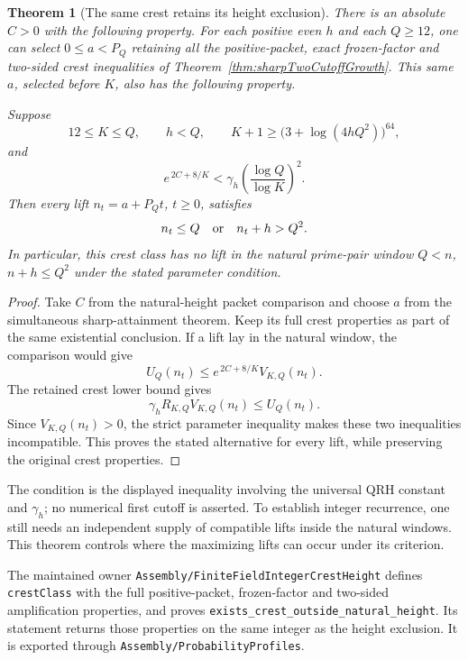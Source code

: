 \documentclass[11pt]{article}
\newtheorem{theorem}{Theorem}[section]
\begin{document}
\begin{theorem}[The same crest retains its height exclusion]
\label{thm:crest-height-exclusion}
There is an absolute \(C>0\) with the following property.
For each positive even \(h\) and each \(Q\geq12\), one can select
\(0\leq a<P_Q\) retaining all the positive-packet, exact frozen-factor
and two-sided crest inequalities of Theorem~\ref{thm:sharpTwoCutoffGrowth}.
This same \(a\), selected before \(K\), also has the following property.

Suppose
\[
 12\leq K\leq Q,\qquad h<Q,\qquad
 K+1\geq\bigl(3+\log(4hQ^2)\bigr)^{64},
\]
and
\[
                 e^{\,2C+8/K}<\gamma_h
                        \left(\frac{\log Q}{\log K}\right)^2.
\]
Then every lift \(n_t=a+P_Qt\), \(t\geq0\), satisfies
\[
                         n_t\leq Q\quad\hbox{or}\quad n_t+h>Q^2.
\]
In particular, this crest class has no lift in the natural prime-pair
window \(Q<n\), \(n+h\leq Q^2\) under the stated parameter condition.
\end{theorem}
\begin{proof}
Take \(C\) from the natural-height packet comparison and choose \(a\)
from the simultaneous sharp-attainment theorem. Keep its full crest
properties as part of the same existential conclusion.
If a lift lay in the natural window, the comparison would give
\[
                    U_Q(n_t)\leq e^{\,2C+8/K}V_{K,Q}(n_t).
\]
The retained crest lower bound gives
\[
               \gamma_hR_{K,Q}V_{K,Q}(n_t)\leq U_Q(n_t).
\]
Since \(V_{K,Q}(n_t)>0\), the strict parameter inequality makes these
two inequalities incompatible. This proves the stated alternative
for every lift, while preserving the original crest properties.
\end{proof}

The condition is the displayed inequality involving the universal QRH
constant and \(\gamma_h\); no numerical first cutoff is asserted.
To establish integer recurrence, one still needs an independent supply
of compatible lifts inside the natural windows. This theorem controls
where the maximizing lifts can occur under its criterion.

The maintained owner \texttt{Assembly/FiniteFieldIntegerCrestHeight}
defines \texttt{crestClass} with the full positive-packet, frozen-factor
and two-sided amplification properties, and proves
\texttt{exists\_crest\_outside\_natural\_height}. Its statement returns
those properties on the same integer as the height exclusion.
It is exported through \texttt{Assembly/ProbabilityProfiles}.
\end{document}
